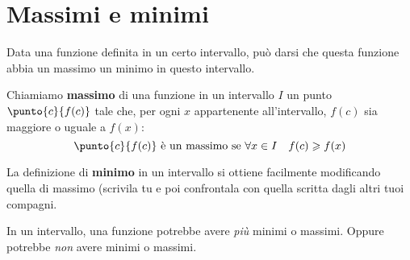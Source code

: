 \begin{comment}
\end{esempio}

\begin{teorema}[Funzioni di funzioni]
Se \(f(x)\) e \(g(x)\) sono funzioni continue, anche \(f(g(x))\) è continua.
\end{teorema}

\noindent Ipotesi: 
\(f(x) \text{ e} g(x)\) sono continue
\tab Tesi: 
\(f(x) \star g(x) = f(g(x))\) è continua.

\begin{proof}
Dato che \(g\) è continua: 
\[f(g(x+\epsilon)) = f(g(x)+\alpha)\]
e dato che \(f\) è continua: 
\[f(g(x)+\alpha)=f(g(x))+\beta\]
quindi: 
\[f(g(x+\epsilon)) = f(g(x)+\alpha) = f(g(x))+\beta \approx f(g(x))\]
\end{proof}

\end{comment}

\section{Massimi e minimi}
\label{sec:cont_massimiminimi}

Data una funzione definita in un certo intervallo, può darsi che questa 
funzione abbia un massimo  un minimo in questo intervallo.

\begin{definizione}
 Chiamiamo \textbf{massimo} di una funzione in un intervallo \(I\) un punto 
\(\punto{c}{f(c)}\) tale che, per ogni \(x\) appartenente all'intervallo, 
\(f(c)\) sia maggiore o uguale a \(f(x)\):
\[\punto{c}{f(c)} \text{ è un massimo se } \forall x \in I \quad
f(c) \geqslant f(x)\]
\end{definizione}

La definizione di \textbf{minimo} in un intervallo si ottiene facilmente 
modificando quella di massimo (scrivila tu e poi confrontala con quella scritta 
dagli altri tuoi compagni.

In un intervallo, una funzione potrebbe avere \emph{più} minimi o massimi. 
Oppure potrebbe \emph{non} avere minimi o massimi.

% 
% 


